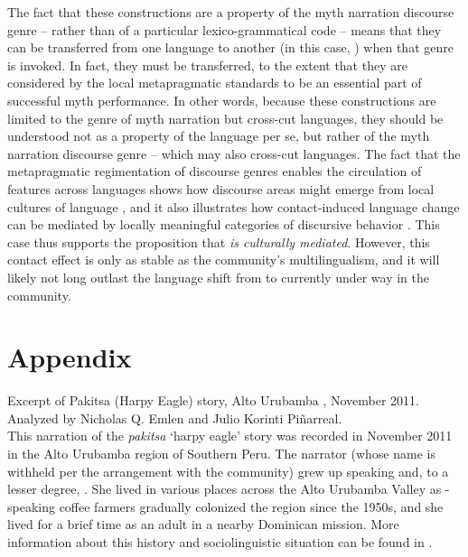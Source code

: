 \documentclass[output=paper]{LSP/langsci}
\begin{document}
The fact that these constructions are a property of the myth narration discourse genre – rather than of a particular lexico-grammatical code – means that they can be transferred from one language to another (in this case, ) when that genre is invoked. In fact, they must be transferred, to the extent that they are considered by the local metapragmatic standards to be an essential part of successful myth performance. In other words, because these constructions are limited to the genre of myth narration but cross-cut languages, they should be understood not as a property of the  language per se, but rather of the myth narration discourse genre – which may also cross-cut languages. The fact that the metapragmatic regimentation of discourse genres enables the circulation of features across languages shows how discourse areas might emerge from local cultures of language \citep[as in ;][]{beieretal.2002}, and it also illustrates how contact-induced language change can be mediated by locally meaningful categories of discursive behavior \citep[i.e., ‘culture’;][]{silverstein76}. This case thus supports the proposition that \textit{ is culturally mediated}. However, this contact effect is only as stable as the community’s multilingualism, and it will likely not long outlast the language shift from  to  currently under way in the community.
%



%
\section*{Appendix}
 \setcounter{equation}{0}
Excerpt of Pakitsa (Harpy Eagle) story, {Alto Urubamba} , November 2011. Analyzed by Nicholas Q. Emlen and Julio Korinti Piñarreal.\\

This narration of the  \textit{pakitsa} `harpy eagle' story was recorded in November 2011 in the {Alto Urubamba} region of Southern Peru. The narrator (whose name is withheld per the arrangement with the community) grew up speaking  and, to a lesser degree, . She lived in various places across the {Alto Urubamba} Valley as -speaking coffee farmers gradually colonized the region since the 1950s, and she lived for a brief time as an adult in a nearby Dominican mission. More information about this history and sociolinguistic situation can be found in \citet{emlen14,emlen.2015,emlen.2017,emlenforth}.
\end{document}
